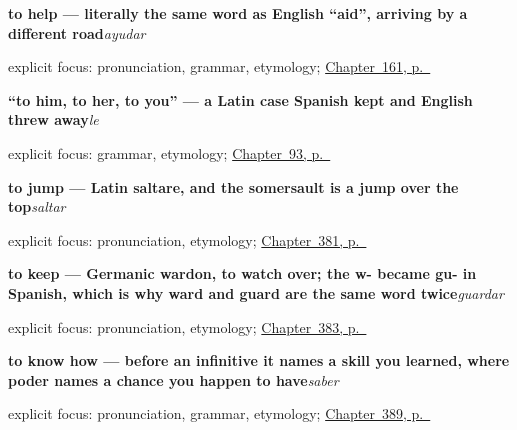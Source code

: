 \noindent\begin{minipage}[t]{\linewidth}
\raggedright
\textbf{to help — literally the same word as English \textquotedblleft{}aid\textquotedblright{}, arriving by a different road}\enspace\emph{ayudar}\par
\footnotesize explicit focus: pronunciation, grammar, etymology; \hyperref[ch:spanish-ayudar]{Chapter~161, p.~\pageref*{ch:spanish-ayudar}}
\end{minipage}\par\smallskip

\noindent\begin{minipage}[t]{\linewidth}
\raggedright
\textbf{\textquotedblleft{}to him, to her, to you\textquotedblright{} — a Latin case Spanish kept and English threw away}\enspace\emph{le}\par
\footnotesize explicit focus: grammar, etymology; \hyperref[ch:pronoun-le]{Chapter~93, p.~\pageref*{ch:pronoun-le}}
\end{minipage}\par\smallskip

\noindent\begin{minipage}[t]{\linewidth}
\raggedright
\textbf{to jump — Latin saltare, and the somersault is a jump over the top}\enspace\emph{saltar}\par
\footnotesize explicit focus: pronunciation, etymology; \hyperref[ch:lavar-y-romper]{Chapter~381, p.~\pageref*{ch:lavar-y-romper}}
\end{minipage}\par\smallskip

\noindent\begin{minipage}[t]{\linewidth}
\raggedright
\textbf{to keep — Germanic wardon, to watch over; the w- became gu- in Spanish, which is why ward and guard are the same word twice}\enspace\emph{guardar}\par
\footnotesize explicit focus: pronunciation, etymology; \hyperref[ch:guardar-y-dejar]{Chapter~383, p.~\pageref*{ch:guardar-y-dejar}}
\end{minipage}\par\smallskip

\noindent\begin{minipage}[t]{\linewidth}
\raggedright
\textbf{to know how — before an infinitive it names a skill you learned, where poder names a chance you happen to have}\enspace\emph{saber}\par
\footnotesize explicit focus: pronunciation, grammar, etymology; \hyperref[ch:saber]{Chapter~389, p.~\pageref*{ch:saber}}
\end{minipage}\par\smallskip

